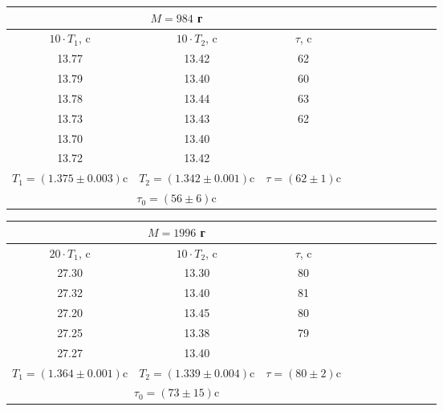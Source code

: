 \documentclass[14pt]{article}
\begin{document}
\begin{center}
\begin{tabular}{|c|c|c|c|c|c|c|c|c|c|c|}
\hline
\multicolumn{3}{|c|}{$M = 984$ г}	\\
\hline
$10\cdot T_1$, c	&	$10\cdot T_2$, c			&	$\tau$, c				\\
\hline
13.77				&	13.42						&	62						\\
\hline
13.79				&	13.40						&	60						\\
\hline
13.78				&	13.44						&	63						\\
\hline
13.73				&	13.43						&	62						\\
\hline
13.70				&	13.40						&							\\
\hline
13.72				&	13.42						&							\\
\hline
$T_1 = (1.375 \pm 0.003)$c		&	$T_2 = (1.342 \pm 0.001)$c		&	$\tau = (62 \pm 1)$c	\\
\hline
\multicolumn{3}{|c|}{$\tau_0 = (56 \pm 6)$c}									\\
\hline
\end{tabular}
\end{center}

\begin{center}
\begin{tabular}{|c|c|c|c|c|c|c|c|c|c|c|}
\hline
\multicolumn{3}{|c|}{$M = 1996$ г}	\\
\hline
$20\cdot T_1$, c	&	$10\cdot T_2$, c			&	$\tau$, c				\\
\hline
27.30				&	13.30						&	80						\\
\hline
27.32				&	13.40						&	81						\\
\hline
27.20				&	13.45						&	80						\\
\hline
27.25				&	13.38						&	79						\\
\hline
27.27				&	13.40						&							\\
\hline
$T_1 = (1.364 \pm 0.001)$c		&	$T_2 = (1.339 \pm 0.004)$c		&	$\tau = (80 \pm 2)$c	\\
\hline
\multicolumn{3}{|c|}{$\tau_0 = (73 \pm 15)$c}									\\
\hline
\end{tabular}
\end{center}
\end{document}
